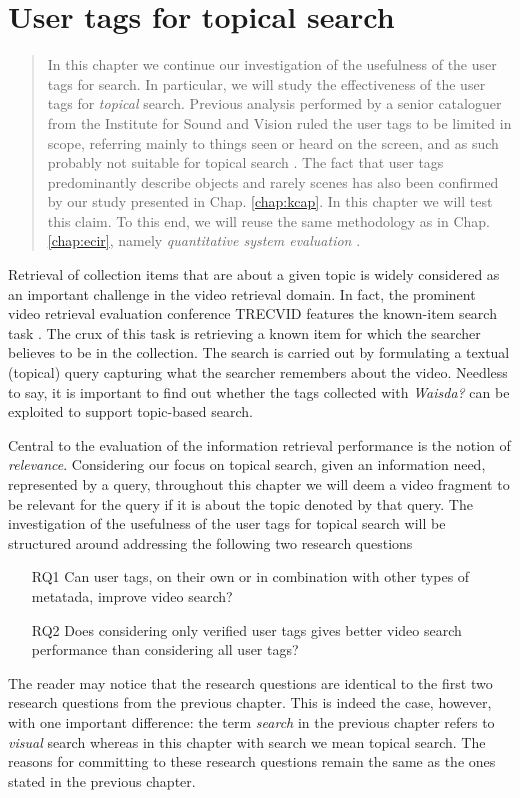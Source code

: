 \chapter{User tags for topical search}\label{chap:topicir}
\begin{quotation}
\noindent
In this chapter we continue our investigation of the usefulness of the user tags for search. In particular, we will study the effectiveness of the user tags for \textit{topical} search. Previous analysis performed by a senior cataloguer from the Institute for Sound and Vision ruled the user tags to be limited in scope, referring mainly to things seen or heard on the screen, and as such probably not suitable for topical search \cite{waisda-lotte,websciencepaper}. The fact that user tags predominantly describe objects and rarely scenes has also been confirmed by our study presented in Chap. \ref{chap:kcap}. In this chapter we will test this claim. To this end, we will reuse the same methodology as in Chap. \ref{chap:ecir}, namely \textit{quantitative system evaluation} \cite{vorhees}.
\end{quotation}

Retrieval of collection items that are about a given topic is widely considered as an important challenge in the video retrieval domain. In fact, the prominent video retrieval evaluation conference TRECVID features the known-item search task \cite{trecvid}. The crux of this task is  retrieving a known item for which the searcher believes to be in the collection. The search is carried out by formulating a textual (topical) query capturing what the searcher remembers about the video. Needless to say, it is important to find out whether the tags collected with \textit{Waisda?} can be exploited to support topic-based search.

Central to the evaluation of the information retrieval performance is the notion of \textit{relevance}. Considering our focus on topical search, given an information need, represented by a query, throughout this chapter we will deem a video fragment to be relevant for the query if it is about the topic denoted by that query. The investigation of the usefulness of the user tags for topical search will be structured around addressing the following two research questions
\begin{itemize}
\item[RQ1] Can user tags, on their own or in combination with other types of metatada, improve video search?
\item[RQ2] Does considering only verified user tags gives better video search performance than considering all user tags?
\end{itemize}
The reader may notice that the research questions are identical to the first two research questions from the previous chapter. This is indeed the case, however, with one important difference: the term \textit{search} in the previous chapter refers to \textit{visual} search whereas in this chapter with search we mean topical search. The reasons for committing to  these research questions remain the same as the ones stated in the previous chapter.


